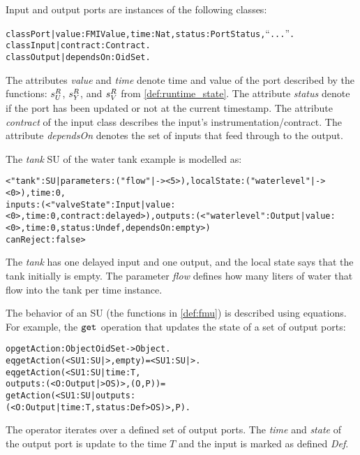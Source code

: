Input and output ports are instances of the following classes:
\begin{alltt}
\small
class Port | value : FMIValue, time : Nat, status : PortStatus, ``...''. 
class Input | contract : Contract .
class Output | dependsOn : OidSet .
\end{alltt}

The attributes \textit{value} and \textit{time} denote time and value of the port described by the functions: $s^{R}_{U_{}}$, $s^{R}_{Y_{}}$, and $s^{R}_{V}$ from \cref{def:runtime_state}.
The attribute \textit{status} denote if the port has been updated or not at the current timestamp.
The attribute \textit{contract} of the input class describes the input's instrumentation/contract.
The attribute \textit{dependsOn} denotes the set of inputs that feed through to the output.

The \textit{tank} SU of the water tank example is modelled as:
\begin{alltt}
  \small
< "tank" : SU | parameters : ("flow" |-> < 5 >), localState : ( "waterlevel" |-> < 0 > ) , time : 0, 
inputs : (< "valveState" : Input | value : < 0 >, time : 0, contract : delayed >), outputs : (< "waterlevel" : Output | value : < 0 >, time : 0, status : Undef, dependsOn : empty >)
canReject : false >
\end{alltt}

The \textit{tank} has one delayed input and one output, and the local state says that the tank initially is empty. 
The parameter \textit{flow} defines how many liters of water that flow into the tank per time instance.

The behavior of an SU (the functions in \cref{def:fmu}) is described using equations.
For example, the $\mathtt{get}_{}$ operation that updates the state of a set of output ports:

\begin{alltt}
  \small
  op getAction : Object OidSet -> Object .
  eq getAction(< SU1 : SU | >, empty) = < SU1 : SU | > .
  eq getAction(< SU1 : SU | time : T, 
                            outputs : (< O : Output | > OS) >, (O , P)) = 
    getAction(< SU1 : SU | outputs : 
    (< O : Output | time : T, status : Def > OS) >, P) .
\end{alltt}

The operator iterates over a defined set of output ports.
The \textit{time} and \textit{state} of the output port is update to the time $T$ and the input is marked as defined \textit{Def}.



